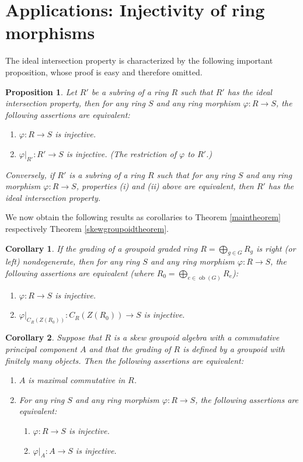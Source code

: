 \documentclass[11pt,leqno]{amsart}
\theoremstyle{plain}
\newtheorem{prop}{Proposition}
\newtheorem{cor}{Corollary}
\theoremstyle{definition}
\DeclareMathOperator{\ob}{ob}
\begin{document}
\section{Applications: Injectivity of ring morphisms}\label{Application_Injectivity}

The ideal intersection property is characterized by the following important proposition,
whose proof is easy and therefore omitted.

\begin{prop}\label{IdealChar}
Let $R'$ be a subring of a ring $R$ such that $R'$ has the ideal intersection property, then
for any ring $S$ and any ring morphism $\varphi : R \to S$, the following assertions are equivalent:
\begin{enumerate}
	\item[{\rm (i)}] $\varphi : R \to S$ is injective.
	\item[{\rm (ii)}] $\varphi\lvert_{R'} : R' \to S$ is injective. (The restriction of $\varphi$ to $R'$.)
\end{enumerate}
Conversely, if $R'$ is a subring of a ring $R$ such that for any
ring $S$ and any ring morphism $\varphi : R \to S$, properties {\rm (i)} and {\rm (ii)} above
are equivalent, then $R'$ has the ideal intersection property.
\end{prop}

We now obtain the following results as corollaries to Theorem \ref{maintheorem} respectively Theorem \ref{skewgroupoidtheorem}.

\begin{cor}
If the grading of a groupoid graded ring $R=\bigoplus_{g\in G} R_g$ is right (or left) nondegenerate, then
for any ring $S$ and any ring morphism $\varphi : R \to S$, the following assertions are equivalent (where $R_0 = \bigoplus_{e\in \ob(G)} R_e$):
\begin{enumerate}
	\item[{\rm (i)}] $\varphi : R \to S$ is injective.
	\item[{\rm (ii)}] $\varphi\lvert_{C_R(Z(R_0))} : C_R(Z(R_0)) \to S$ is injective.
\end{enumerate}
\end{cor}

\begin{cor}
Suppose that $R$ is a skew groupoid
algebra with a commutative principal
component $A$ and that the grading of $R$ is defined by a
groupoid with finitely many objects. Then the following assertions are equivalent:
\begin{enumerate}
	\item[{\rm (i)}] $A$ is maximal commutative in $R$.
	\item[{\rm (ii)}] For any ring $S$ and any ring morphism $\varphi : R \to S$, the following assertions are equivalent:
\begin{enumerate}
	\item[{\rm (a)}] $\varphi : R \to S$ is injective.
	\item[{\rm (b)}] $\varphi\lvert_{A} : A \to S$ is injective.
\end{enumerate}
\end{enumerate}

\end{cor}
\end{document}
